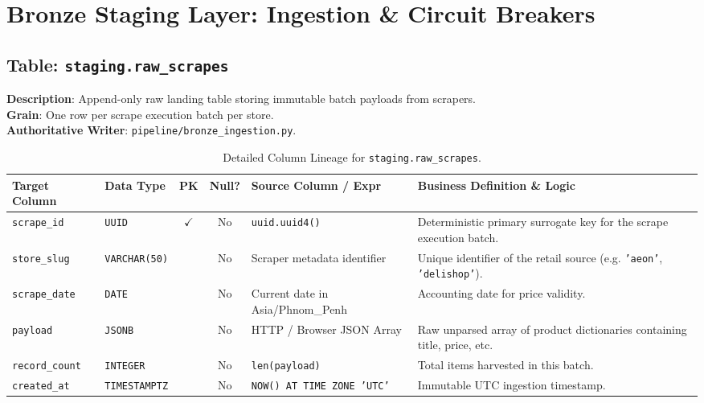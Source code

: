 \documentclass[a4paper, 11pt]{article}
\begin{document}
\newpage
\section{Bronze Staging Layer: Ingestion \& Circuit Breakers}

\subsection{Table: \texttt{staging.raw\_scrapes}}
\textbf{Description}: Append-only raw landing table storing immutable batch payloads from scrapers. \\
\textbf{Grain}: One row per scrape execution batch per store. \\
\textbf{Authoritative Writer}: \texttt{pipeline/bronze\_ingestion.py}.

\begin{table}[H]
\centering
\small
\begin{tabularx}{\textwidth}{l p{2.8cm} c c p{4.0cm} X}
\toprule
\textbf{Target Column} & \textbf{Data Type} & \textbf{PK} & \textbf{Null?} & \textbf{Source Column / Expr} & \textbf{Business Definition \& Logic} \\
\midrule
\texttt{scrape\_id} & \texttt{UUID} & $\checkmark$ & No & \texttt{uuid.uuid4()} & Deterministic primary surrogate key for the scrape execution batch. \\
\texttt{store\_slug} & \texttt{VARCHAR(50)} & & No & Scraper metadata identifier & Unique identifier of the retail source (e.g. \texttt{'aeon'}, \texttt{'delishop'}). \\
\texttt{scrape\_date} & \texttt{DATE} & & No & Current date in Asia/Phnom\_Penh & Accounting date for price validity. \\
\texttt{payload} & \texttt{JSONB} & & No & HTTP / Browser JSON Array & Raw unparsed array of product dictionaries containing title, price, etc. \\
\texttt{record\_count} & \texttt{INTEGER} & & No & \texttt{len(payload)} & Total items harvested in this batch. \\
\texttt{created\_at} & \texttt{TIMESTAMPTZ} & & No & \texttt{NOW() AT TIME ZONE 'UTC'} & Immutable UTC ingestion timestamp. \\
\bottomrule
\end{tabularx}
\caption{Detailed Column Lineage for \texttt{staging.raw\_scrapes}.}
\end{table}
\end{document}
